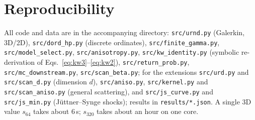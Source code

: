 \documentclass[aps,prd,twocolumn,superscriptaddress,nofootinbib,floatfix]{revtex4-2}
\begin{document}
\appendix
\section{Reproducibility}
All code and data are in the accompanying directory: \texttt{src/urnd.py} (Galerkin, 3D/2D),
\texttt{src/dord\_hp.py} (discrete ordinates), \texttt{src/finite\_gamma.py}, \texttt{src/model\_select.py},
\texttt{src/anisotropy.py}, \texttt{src/kw\_identity.py} (symbolic re-derivation of
Eqs.~\eqref{eq:kw3}--\eqref{eq:kw2}), \texttt{src/return\_prob.py}, \texttt{src/mc\_downstream.py},
\texttt{src/scan\_beta.py}; for the extensions \texttt{src/urd.py} and \texttt{src/scan\_d.py} (dimension $d$),
\texttt{src/aniso.py}, \texttt{src/kernel.py} and \texttt{src/scan\_aniso.py} (general scattering), and
\texttt{src/js\_curve.py} and \texttt{src/js\_min.py} (J\"uttner--Synge shocks); results in \texttt{results/*.json}. A single 3D value $s_{64}$ takes about 6\,s; $s_{320}$
takes about an hour on one core.


\end{document}
